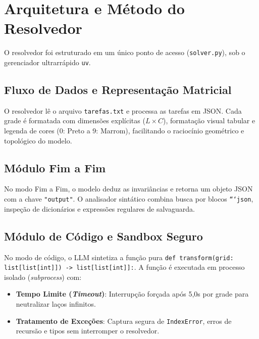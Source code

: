 \documentclass{article}
\begin{document}
\section{Arquitetura e Método do Resolvedor}

O resolvedor foi estruturado em um único ponto de acesso (\texttt{solver.py}), sob o gerenciador ultrarrápido \texttt{uv}.

\subsection{Fluxo de Dados e Representação Matricial}
O resolvedor lê o arquivo \texttt{tarefas.txt} e processa as tarefas em JSON. Cada grade é formatada com dimensões explícitas ($L \times C$), formatação visual tabular e legenda de cores (0: Preto a 9: Marrom), facilitando o raciocínio geométrico e topológico do modelo.

\subsection{Módulo Fim a Fim}
No modo Fim a Fim, o modelo deduz as invariâncias e retorna um objeto JSON com a chave \texttt{"output"}. O analisador sintático combina busca por blocos \texttt{```json}, inspeção de dicionários e expressões regulares de salvaguarda.

\subsection{Módulo de Código e Sandbox Seguro}
No modo de código, o LLM sintetiza a função pura \texttt{def transform(grid: list[list[int]]) -> list[list[int]]:}. A função é executada em processo isolado (\textit{subprocess}) com:
\begin{itemize}
    \item \textbf{Tempo Limite (\textit{Timeout})}: Interrupção forçada após 5,0s por grade para neutralizar laços infinitos.
    \item \textbf{Tratamento de Exceções}: Captura segura de \texttt{IndexError}, erros de recursão e tipos sem interromper o resolvedor.
\end{itemize}
\end{document}
